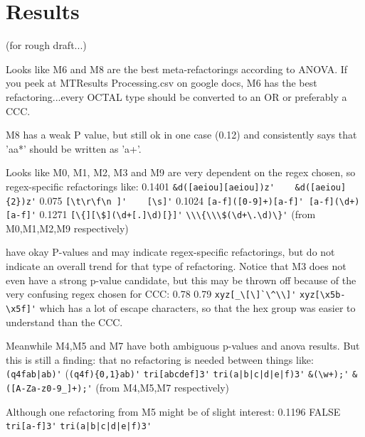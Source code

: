 
\section{Results}
\label{sec:results}
(for rough draft...)

Looks like M6 and M8 are the best meta-refactorings according to ANOVA.
If you peek at MTResults Processing.csv on google docs, M6 has the best refactoring...every OCTAL type should be converted to an OR or preferably a CCC.

M8 has a weak P value, but still ok in one case (0.12) and consistently says that 'aa*' should be written as 'a+'.

Looks like M0, M1, M2, M3 and M9 are very dependent on the regex chosen, so regex-specific refactorings like:
0.1401 \verb!&d([aeiou][aeiou])z'    &d([aeiou]{2})z'!
0.075   \verb![\t\r\f\n ]'    [\s]'!
0.1024  \verb![a-f]([0-9]+)[a-f]' [a-f](\d+)[a-f]'!
0.1271  \verb![\{][\$](\d+[.]\d)[}]'!
\verb!\\\{\\\$(\d+\.\d)\}'!
(from M0,M1,M2,M9 respectively)

have okay P-values and may indicate regex-specific refactorings, but do not indicate an overall trend for that type of refactoring.
Notice that M3 does not even have a strong p-value candidate, but this may be thrown off because of the very confusing regex chosen for CCC:
0.78    0.79
\verb!xyz[_\[\]`\^\\]'!    \verb!xyz[\x5b-\x5f]'!
which has a lot of escape characters, so that the hex group was easier to understand than the CCC.



Meanwhile M4,M5 and M7 have both ambiguous p-values and anova results.  But this is still a finding: that no refactoring is needed between things like:
\verb!(q4fab|ab)'! (\verb!(q4f){0,1}ab)'!
\verb!tri[abcdef]3'!   \verb!tri(a|b|c|d|e|f)3'!
\verb!&(\w+);'!    \verb!&([A-Za-z0-9_]+);'!
(from M4,M5,M7 respectively)

Although one refactoring from M5 might be of slight interest:
0.1196  FALSE   \verb!tri[a-f]3'!  \verb!tri(a|b|c|d|e|f)3'!

